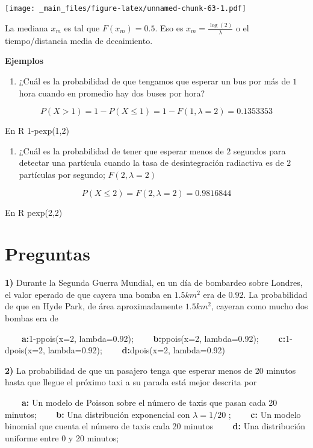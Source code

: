 \documentclass[
]{book}
\providecommand{\tightlist}{%
  \setlength{\itemsep}{0pt}\setlength{\parskip}{0pt}}
\begin{document}
\texttt{[image: \_main\_files/figure-latex/unnamed-chunk-63-1.pdf]}

La mediana \(x_m\) es tal que \(F(x_m)=0.5\). Eso es \(x_m=\frac{\log(2)}{\lambda}\) o el tiempo/distancia media de decaimiento.

\textbf{Ejemplos}

\begin{enumerate}
\def\labelenumi{\arabic{enumi})}
\tightlist
\item
  ¿Cuál es la probabilidad de que tengamos que esperar un bus por más de \(1\) hora cuando en promedio hay dos buses por hora?
\end{enumerate}

\[P(X > 1)=1-P(X \le 1) = 1-F(1,\lambda=2)=0.1353353\]

En R 1-pexp(1,2)

\begin{enumerate}
\def\labelenumi{\arabic{enumi})}
\setcounter{enumi}{1}
\tightlist
\item
  ¿Cuál es la probabilidad de tener que esperar menos de \(2\) segundos para detectar una partícula cuando la tasa de desintegración radiactiva es de \(2\) partículas por segundo; \(F(2,\lambda=2)\)
\end{enumerate}

\[P(X\le 2)=F(2,\lambda=2)=0.9816844\]

En R pexp(2,2)

\hypertarget{preguntas-5}{%
\section{Preguntas}\label{preguntas-5}}

\textbf{1)} Durante la Segunda Guerra Mundial, en un día de bombardeo sobre Londres, el valor eperado de que cayera una bomba en \(1.5km^2\) era de \(0.92\). La probabilidad de que en Hyde Park, de área aproximadamente \(1.5km^2\), cayeran como mucho dos bombas era de

\textbf{\(\qquad\)a:}1-ppois(x=2, lambda=0.92);
\textbf{\(\qquad\)b:}ppois(x=2, lambda=0.92); \textbf{\(\qquad\)c:}1-dpois(x=2, lambda=0.92); \textbf{\(\qquad\)d:}dpois(x=2, lambda=0.92)

\textbf{2)} La probabilidad de que un pasajero tenga que esperar menos de 20 minutos hasta que llegue el próximo taxi a su parada está mejor descrita por

\textbf{\(\qquad\)a:} Un modelo de Poisson sobre el número de taxis que pasan cada 20 minutos;
\textbf{\(\qquad\)b:} Una distribución exponencial con \(\lambda=1/20\) ;
\textbf{\(\qquad\)c:} Un modelo binomial que cuenta el número de taxis cada 20 minutos
\textbf{\(\qquad\)d:} Una distribución uniforme entre 0 y 20 minutos;
\end{document}
